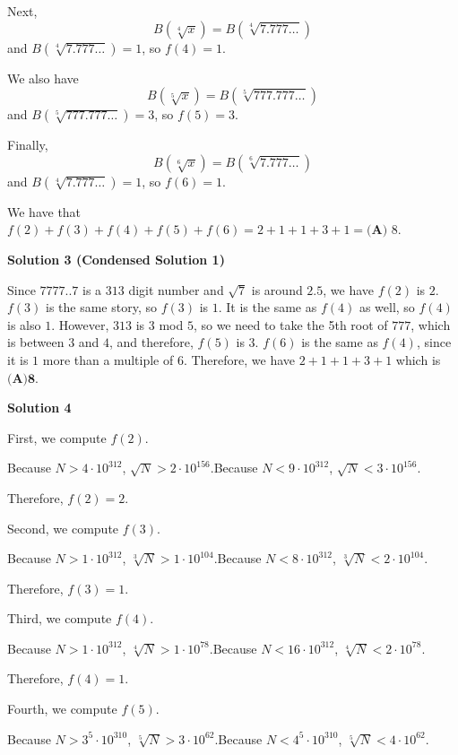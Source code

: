 \begin{enumerate}
 Next,
 \[B(\sqrt[4]{x}) = B(\sqrt[4]{7.777 \ldots})\]and $B(\sqrt[4]{7.777 \ldots}) = 1$, so $f(4) = 1$.

 We also have
 \[B(\sqrt[5]{x}) = B(\sqrt[5]{777.777 \ldots})\]and $B(\sqrt[5]{777.777 \ldots}) = 3$, so $f(5) = 3$.

 Finally,
 \[B(\sqrt[6]{x}) = B(\sqrt[6]{7.777 \ldots})\]and $B(\sqrt[4]{7.777 \ldots}) = 1$, so $f(6) = 1$.

 We have that $f(2)+f(3)+f(4)+f(5)+f(6) = 2+1+1+3+1 = \boxed{\textbf{(A) } 8}$.

 



\textbf{Solution 3 (Condensed Solution 1)}

Since $7777..7$ is a $313$ digit number and $\sqrt {7}$ is around $2.5$, we have $f(2)$ is $2$. $f(3)$ is the same story, so $f(3)$ is $1$. It is the same as $f(4)$ as well, so $f(4)$ is also $1$. However, $313$ is $3$ mod $5$, so we need to take the 5th root of $777$, which is between $3$ and $4$, and therefore, $f(5)$ is $3$. $f(6)$ is the same as $f(4)$, since it is $1$ more than a multiple of $6$. Therefore, we have $2+1+1+3+1$ which is $\boxed {\textbf{(A)8}}$.

 



\textbf{Solution 4}

First, we compute $f \left( 2 \right)$.

 Because $N > 4 \cdot 10^{312}$, $\sqrt{N} > 2 \cdot 10^{156}$.Because $N < 9 \cdot 10^{312}$, $\sqrt{N} < 3 \cdot 10^{156}$.

 Therefore, $f \left( 2 \right) = 2$.

 Second, we compute $f \left( 3 \right)$.

 Because $N > 1 \cdot 10^{312}$, $\sqrt[3]{N} > 1 \cdot 10^{104}$.Because $N < 8 \cdot 10^{312}$, $\sqrt[3]{N} < 2 \cdot 10^{104}$.

 Therefore, $f \left( 3 \right) = 1$.

 Third, we compute $f \left( 4 \right)$.

 Because $N > 1 \cdot 10^{312}$, $\sqrt[4]{N} > 1 \cdot 10^{78}$.Because $N < 16 \cdot 10^{312}$, $\sqrt[4]{N} < 2 \cdot 10^{78}$.

 Therefore, $f \left( 4 \right) = 1$.

 
Fourth, we compute $f \left( 5 \right)$.

 Because $N > 3^5 \cdot 10^{310}$, $\sqrt[5]{N} > 3 \cdot 10^{62}$.Because $N < 4^5 \cdot 10^{310}$, $\sqrt[5]{N} < 4 \cdot 10^{62}$.


\end{enumerate}

